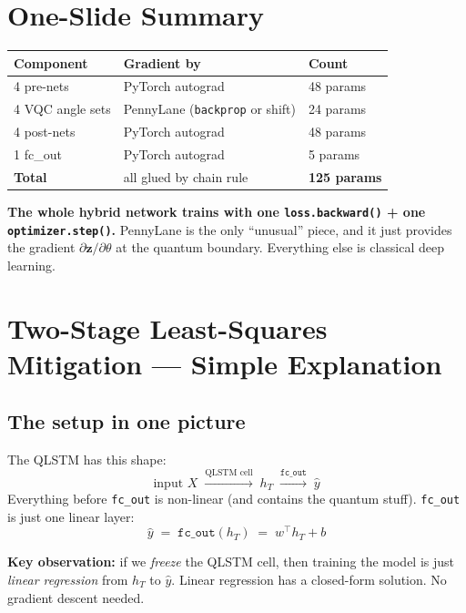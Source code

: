\documentclass[11pt,a4paper]{article}
\begin{document}
\section{One-Slide Summary}

\begin{center}
\begin{tabular}{@{}lll@{}}
\toprule
\textbf{Component} & \textbf{Gradient by} & \textbf{Count} \\
\midrule
4 pre-nets       & PyTorch autograd                         & 48 params \\
4 VQC angle sets & PennyLane (\texttt{backprop} or shift)   & 24 params \\
4 post-nets      & PyTorch autograd                         & 48 params \\
1 fc\_out        & PyTorch autograd                         & 5 params \\
\midrule
\textbf{Total}   & all glued by chain rule                  & \textbf{125 params} \\
\bottomrule
\end{tabular}
\end{center}

\textbf{The whole hybrid network trains with one \texttt{loss.backward()} + one \texttt{optimizer.step()}.}
PennyLane is the only ``unusual'' piece, and it just provides the gradient
$\partial \mathbf{z} / \partial \theta$ at the quantum boundary. Everything else
is classical deep learning.

\section{Two-Stage Least-Squares Mitigation --- Simple Explanation}

\subsection{The setup in one picture}

The QLSTM has this shape:
\[
  \text{input } X \;\xrightarrow{\text{QLSTM cell}}\; h_T \;\xrightarrow{\texttt{fc\_out}}\; \hat y
\]
Everything before \texttt{fc\_out} is non-linear (and contains the quantum stuff). \texttt{fc\_out} is just one linear layer:
\[
  \hat y \;=\; \texttt{fc\_out}(h_T) \;=\; w^\top h_T + b
\]

\textbf{Key observation:} if we \emph{freeze} the QLSTM cell, then training the model is just \emph{linear regression} from $h_T$ to $\hat y$. Linear regression has a closed-form solution. No gradient descent needed.
\end{document}
